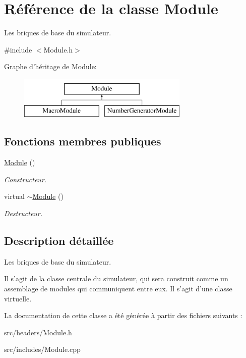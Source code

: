 \hypertarget{classModule}{\section{Référence de la classe Module}
\label{classModule}
}


Les briques de base du simulateur.  




{\ttfamily \#include $<$Module.\-h$>$}

Graphe d'héritage de Module\-:\begin{figure}[H]
\begin{center}
\leavevmode
\includegraphics[height=2.000000cm]{classModule}
\end{center}
\end{figure}
\subsection*{Fonctions membres publiques}
\begin{DoxyCompactItemize}
\item 
\hypertarget{classModule_a5a240a8a9ab1813b17bcb810b24ceaea}{\hyperlink{classModule_a5a240a8a9ab1813b17bcb810b24ceaea}{Module} ()}\label{classModule_a5a240a8a9ab1813b17bcb810b24ceaea}

\begin{DoxyCompactList}\small\item\em Constructeur. \end{DoxyCompactList}\item 
\hypertarget{classModule_a7c9d9c096786d127590fdd8aa2b7d681}{virtual \hyperlink{classModule_a7c9d9c096786d127590fdd8aa2b7d681}{$\sim$\-Module} ()}\label{classModule_a7c9d9c096786d127590fdd8aa2b7d681}

\begin{DoxyCompactList}\small\item\em Destructeur. \end{DoxyCompactList}\end{DoxyCompactItemize}


\subsection{Description détaillée}
Les briques de base du simulateur. 

Il s'agit de la classe centrale du simulateur, qui sera construit comme un assemblage de modules qui communiquent entre eux. Il s'agit d'une classe virtuelle. 

La documentation de cette classe a été générée à partir des fichiers suivants \-:\begin{DoxyCompactItemize}
\item 
src/headers/Module.\-h\item 
src/includes/Module.\-cpp\end{DoxyCompactItemize}
